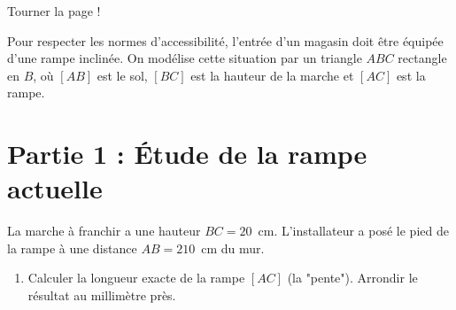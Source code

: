 \documentclass[a4paper]{book}
\begin{document}
{\vfill
\hfill Tourner la page !


    \begin{exercice}
        \noindent Pour respecter les normes d'accessibilité, l'entrée d'un magasin doit être équipée d'une rampe inclinée. On modélise cette situation par un triangle $ABC$ rectangle en $B$, où $[AB]$ est le sol, $[BC]$ est la hauteur de la marche et $[AC]$ est la rampe.

        \section*{Partie 1 : Étude de la rampe actuelle}
        La marche à franchir a une hauteur $BC = 20$~cm. L'installateur a posé le pied de la rampe à une distance $AB = 210$~cm du mur.

        \begin{center}
        \end{center}

        \begin{enumerate}[leftmargin=*]
            \item Calculer la longueur exacte de la rampe $[AC]$ (la "pente"). Arrondir le résultat au millimètre près.
        \end{enumerate}  


\end{exercice}}
\end{document}
